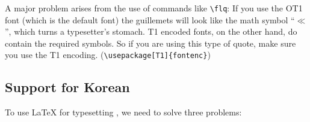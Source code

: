 A major problem arises from the use of commands
like \verb+\flq+: If you use the OT1 font (which is the default font) the  
guillemets will look like the math symbol ``$\ll$'', which turns a typesetter's stomach.
T1 encoded fonts, on the other hand, do contain the required symbols. So if you are using this type
of quote, make sure you use the T1 encoding. (\verb|\usepackage[T1]{fontenc}|)

\subsection[Support for Korean]{Support for Korean\footnotemark}\label{support_korean}%

To use \LaTeX{} for typesetting  , 
we need to solve three problems: 

